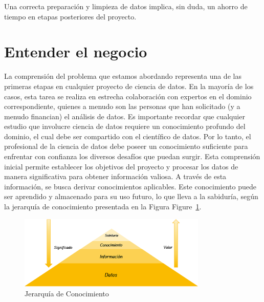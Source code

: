 \documentclass[
  letterpaper,
  DIV=11,
  numbers=noendperiod]{scrreprt}
\begin{document}
\begin{tcolorbox}[enhanced jigsaw, arc=.35mm, breakable, coltitle=black, left=2mm, opacityback=0, bottomtitle=1mm, colbacktitle=quarto-callout-important-color!10!white, title=\textcolor{quarto-callout-important-color}{\faExclamation}\hspace{0.5em}{Para recordar}, titlerule=0mm, colback=white, colframe=quarto-callout-important-color-frame, bottomrule=.15mm, rightrule=.15mm, opacitybacktitle=0.6, toptitle=1mm, toprule=.15mm, leftrule=.75mm]

Una correcta preparación y limpieza de datos implica, sin duda, un
ahorro de tiempo en etapas posteriores del proyecto.

\end{tcolorbox}

\hypertarget{entender-el-negocio}{%
\section{Entender el negocio}\label{entender-el-negocio}}

La comprensión del problema que estamos abordando representa una de las
primeras etapas en cualquier proyecto de ciencia de datos. En la mayoría
de los casos, esta tarea se realiza en estrecha colaboración con
expertos en el dominio correspondiente, quienes a menudo son las
personas que han solicitado (y a menudo financian) el análisis de datos.
Es importante recordar que cualquier estudio que involucre ciencia de
datos requiere un conocimiento profundo del dominio, el cual debe ser
compartido con el científico de datos. Por lo tanto, el profesional de
la ciencia de datos debe poseer un conocimiento suficiente para
enfrentar con confianza los diversos desafíos que puedan surgir. Esta
comprensión inicial permite establecer los objetivos del proyecto y
procesar los datos de manera significativa para obtener información
valiosa. A través de esta información, se busca derivar conocimientos
aplicables. Este conocimiento puede ser aprendido y almacenado para su
uso futuro, lo que lleva a la sabiduría, según la jerarquía de
conocimiento presentada en la Figura Figure~\ref{fig-cono}.

\begin{figure}

{\centering \includegraphics[width=0.8\textwidth,height=\textheight]{EDA/conocimiento.png}

}

\caption{\label{fig-cono}Jerarquía de Conocimiento}

\end{figure}
\end{document}
